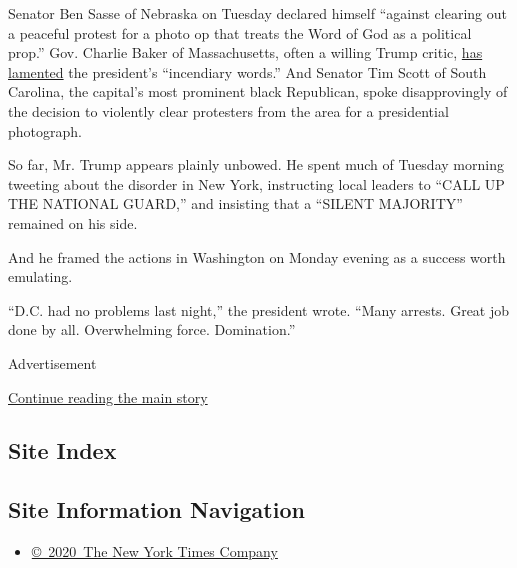 Senator Ben Sasse of Nebraska on Tuesday declared himself ``against
clearing out a peaceful protest for a photo op that treats the Word of
God as a political prop.'' Gov. Charlie Baker of Massachusetts, often a
willing Trump critic,
\href{https://www.cnn.com/2020/06/01/politics/charlie-baker-donald-trump-governor-call/index.html}{has
lamented} the president's ``incendiary words.'' And Senator Tim Scott of
South Carolina, the capital's most prominent black Republican, spoke
disapprovingly of the decision to violently clear protesters from the
area for a presidential photograph.

So far, Mr. Trump appears plainly unbowed. He spent much of Tuesday
morning tweeting about the disorder in New York, instructing local
leaders to ``CALL UP THE NATIONAL GUARD,'' and insisting that a ``SILENT
MAJORITY'' remained on his side.

And he framed the actions in Washington on Monday evening as a success
worth emulating.

``D.C. had no problems last night,'' the president wrote. ``Many
arrests. Great job done by all. Overwhelming force. Domination.''

Advertisement

\protect\hyperlink{after-bottom}{Continue reading the main story}

\hypertarget{site-index}{%
\subsection{Site Index}\label{site-index}}

\hypertarget{site-information-navigation}{%
\subsection{Site Information
Navigation}\label{site-information-navigation}}

\begin{itemize}
\tightlist
\item
  \href{https://help.nytimes.com/hc/en-us/articles/115014792127-Copyright-notice}{©~2020~The
  New York Times Company}
\end{itemize}

